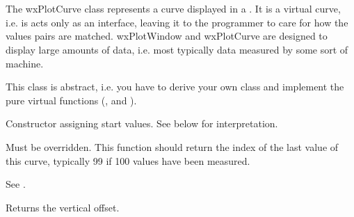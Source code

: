 %
%

\section{}\label{wxplotcurve}

The wxPlotCurve class represents a curve displayed in a . It
is a virtual curve, i.e. is acts only as an interface, leaving it to the programmer to care for
how the values pairs are matched. wxPlotWindow and wxPlotCurve are designed to display large
amounts of data, i.e. most typically data measured by some sort of machine.

This class is abstract, i.e. you have to derive your own class and implement the pure
virtual functions (, 
and ).




\label{wxplotcurvewxplotcurve}


Constructor assigning start values. See below for interpretation.

\label{wxplotcurvegetendx}


Must be overridden. This function should return the index of the last value
of this curve, typically 99 if 100 values have been measured.

\label{wxplotcurvegetendy}


See .

\label{wxplotcurvegetoffsety}


Returns the vertical offset.
\label{wxplotcurvegety}



